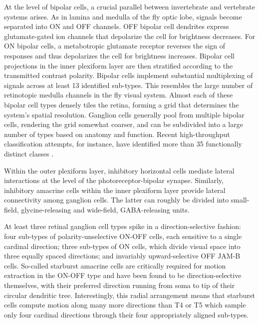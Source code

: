 At the level of bipolar cells, a crucial parallel between invertebrate and vertebrate systems arises. As in lamina and medulla of the fly optic lobe, signals become separated into ON and OFF channels. OFF bipolar cell dendrites express glutamate-gated ion channels that depolarize the cell for brightness decreases. For ON bipolar cells, a metabotropic glutamate receptor reverses the sign of responses and thus depolarizes the cell for brightness increases. Bipolar cell projections in the inner plexiform layer are then stratified according to the transmitted contrast polarity. Bipolar cells implement substantial multiplexing of signals across at least 13 identified sub-types. This resembles the large number of retinotopic medulla channels in the fly visual system. Almost each of these bipolar cell types densely tiles the retina, forming a grid that determines the system's spatial resolution. Ganglion cells generally pool from multiple bipolar cells, rendering the grid somewhat coarser, and can be subdivided into a large number of types based on anatomy and function. Recent high-throughput classification attempts, for instance, have identified more than 35 functionally distinct classes \citep{Baden:2016aa}. 

Within the outer plexiform layer, inhibitory horizontal cells mediate lateral interactions at the level of the photoreceptor-bipolar synapse. Similarly, inhibitory amacrine cells within the inner plexiform layer provide lateral connectivity among ganglion cells. The latter can roughly be divided into small-field, glycine-releasing and wide-field, GABA-releasing units.

At least three retinal ganglion cell types spike in a direction-selective fashion: four sub-types of polarity-unselective ON-OFF cells, each sensitive to a single cardinal direction; three sub-types of ON cells, which divide visual space into three equally spaced directions; and invariably upward-selective OFF JAM-B cells. So-called starburst amacrine cells are critically required for motion extraction in the ON-OFF type and have been found to be direction-selective themselves, with their preferred direction running from soma to tip of their circular dendritic tree. Interestingly, this radial arrangement means that starburst cells compute motion along many more directions than T4 or T5 which sample only four cardinal directions through their four appropriately aligned sub-types.

